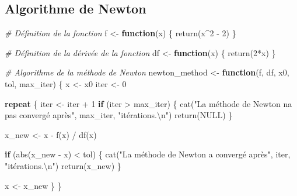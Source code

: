\documentclass[
]{article}
\newenvironment{Shaded}{\begin{snugshade}}{\end{snugshade}}
\newcommand{\CommentTok}[1]{\textcolor[rgb]{0.56,0.35,0.01}{\textit{#1}}}
\newcommand{\ConstantTok}[1]{\textcolor[rgb]{0.00,0.00,0.00}{#1}}
\newcommand{\ControlFlowTok}[1]{\textcolor[rgb]{0.13,0.29,0.53}{\textbf{#1}}}
\newcommand{\DecValTok}[1]{\textcolor[rgb]{0.00,0.00,0.81}{#1}}
\newcommand{\FunctionTok}[1]{\textcolor[rgb]{0.00,0.00,0.00}{#1}}
\newcommand{\NormalTok}[1]{#1}
\newcommand{\OtherTok}[1]{\textcolor[rgb]{0.56,0.35,0.01}{#1}}
\newcommand{\SpecialCharTok}[1]{\textcolor[rgb]{0.00,0.00,0.00}{#1}}
\newcommand{\StringTok}[1]{\textcolor[rgb]{0.31,0.60,0.02}{#1}}
\begin{document}
\hypertarget{algorithme-de-newton}{%
\subsection{Algorithme de Newton}\label{algorithme-de-newton}}

\begin{Shaded}
\begin{Highlighting}[]
\CommentTok{\# Définition de la fonction}
\NormalTok{f }\OtherTok{\textless{}{-}} \ControlFlowTok{function}\NormalTok{(x) \{}
  \FunctionTok{return}\NormalTok{(x}\SpecialCharTok{\^{}}\DecValTok{2} \SpecialCharTok{{-}} \DecValTok{2}\NormalTok{)}
\NormalTok{\}}

\CommentTok{\# Définition de la dérivée de la fonction}
\NormalTok{df }\OtherTok{\textless{}{-}} \ControlFlowTok{function}\NormalTok{(x) \{}
  \FunctionTok{return}\NormalTok{(}\DecValTok{2}\SpecialCharTok{*}\NormalTok{x)}
\NormalTok{\}}

\CommentTok{\# Algorithme de la méthode de Newton}
\NormalTok{newton\_method }\OtherTok{\textless{}{-}} \ControlFlowTok{function}\NormalTok{(f, df, x0, tol, max\_iter) \{}
\NormalTok{  x }\OtherTok{\textless{}{-}}\NormalTok{ x0}
\NormalTok{  iter }\OtherTok{\textless{}{-}} \DecValTok{0}
  
  \ControlFlowTok{repeat}\NormalTok{ \{}
\NormalTok{    iter }\OtherTok{\textless{}{-}}\NormalTok{ iter }\SpecialCharTok{+} \DecValTok{1}
    \ControlFlowTok{if}\NormalTok{ (iter }\SpecialCharTok{\textgreater{}}\NormalTok{ max\_iter) \{}
      \FunctionTok{cat}\NormalTok{(}\StringTok{"La méthode de Newton n\textquotesingle{}a pas convergé après"}\NormalTok{, max\_iter, }\StringTok{"itérations.}\SpecialCharTok{\textbackslash{}n}\StringTok{"}\NormalTok{)}
      \FunctionTok{return}\NormalTok{(}\ConstantTok{NULL}\NormalTok{)}
\NormalTok{    \}}
    
\NormalTok{    x\_new }\OtherTok{\textless{}{-}}\NormalTok{ x }\SpecialCharTok{{-}} \FunctionTok{f}\NormalTok{(x) }\SpecialCharTok{/} \FunctionTok{df}\NormalTok{(x)}
    
    \ControlFlowTok{if}\NormalTok{ (}\FunctionTok{abs}\NormalTok{(x\_new }\SpecialCharTok{{-}}\NormalTok{ x) }\SpecialCharTok{\textless{}}\NormalTok{ tol) \{}
      \FunctionTok{cat}\NormalTok{(}\StringTok{"La méthode de Newton a convergé après"}\NormalTok{, iter, }\StringTok{"itérations.}\SpecialCharTok{\textbackslash{}n}\StringTok{"}\NormalTok{)}
      \FunctionTok{return}\NormalTok{(x\_new)}
\NormalTok{    \}}
    
\NormalTok{    x }\OtherTok{\textless{}{-}}\NormalTok{ x\_new}
\NormalTok{  \}}
\NormalTok{\}}


\end{Highlighting}
\end{Shaded}
\end{document}
